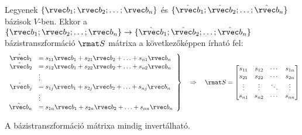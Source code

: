 \begin{definition}[Bázistranszformáció]
  Legyenek $\{ \rvec b_1; \rvec b_2; \ldots; \rvec b_n \}$ és
  $\{ \hat{\rvec b}_1; \hat{\rvec b}_2; \ldots; \hat{\rvec b}_n \}$ bázisok
  $V$-ben. Ekkor a $\{ \rvec b_1; \rvec b_2; \ldots; \rvec b_n \} \rightarrow
    \{ \hat{\rvec b}_1; \hat{\rvec b}_2; \ldots; \hat{\rvec b}_n \}$
  bázistranszformáció $\rmat S$ mátrixa a következőképpen írható fel:
  $$
    \left.\begin{array}{rl}
      \hat{\rvec b}_1 & = s_{11} \rvec b_1 + s_{21} \rvec b_2 + \ldots + s_{n1} \rvec b_n \\
      \hat{\rvec b}_2 & = s_{12} \rvec b_1 + s_{22} \rvec b_2 + \ldots + s_{n2} \rvec b_n \\
                      & \vdots                                                            \\
      \hat{\rvec b}_j & = s_{1j} \rvec b_1 + s_{2j} \rvec b_2 + \ldots + s_{nj} \rvec b_n \\
                      & \vdots                                                            \\
      \hat{\rvec b}_n & = s_{1n} \rvec b_1 + s_{2n} \rvec b_2 + \ldots + s_{nn} \rvec b_n
    \end{array}\right\}
    \quad\Rightarrow\quad
    \rmat S = \begin{bmatrix}
      s_{11} & s_{12} & \cdots & s_{1n} \\
      s_{21} & s_{22} & \cdots & s_{2n} \\
      \vdots & \vdots & \ddots & \vdots \\
      s_{n1} & s_{n2} & \cdots & s_{nn}
    \end{bmatrix}
  $$
\end{definition}

\begin{statement}
  A bázistranszformáció mátrixa mindig invertálható.
\end{statement}